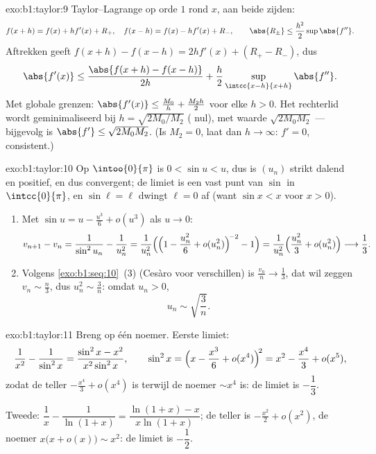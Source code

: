 \begin{solution}{exo:b1:taylor:9}
Taylor--Lagrange op orde $1$ rond $x$, aan beide zijden:
\[
f(x + h) = f(x) + h f'(x) + R_+,\quad
f(x - h) = f(x) - h f'(x) + R_-,
\qquad \abs{R_\pm} \leq \frac{h^2}{2} \sup \abs{f''} .
\]
Aftrekken geeft $f(x+h) - f(x-h) = 2h f'(x) + (R_+ - R_-)$, dus
\[
\abs{f'(x)} \leq \frac{\abs{f(x+h) - f(x-h)}}{2h} +
\frac{h}{2}\sup_{\intcc{x-h}{x+h}}\abs{f''} .
\]
Met globale grenzen: $\abs{f'(x)} \leq \frac{M_0}{h} + \frac{M_2
h}{2}$ voor elke $h > 0$. Het rechterlid wordt geminimaliseerd bij
$h = \sqrt{2M_0/M_2}$ ( nul), met waarde
$\sqrt{2M_0M_2}$ --- bijgevolg is $\abs{f'} \leq \sqrt{2M_0M_2}$.
(Is $M_2 = 0$, laat dan $h \to \infty$: $f' = 0$, consistent.)
\end{solution}

\begin{solution}{exo:b1:taylor:10}
Op $\intoo{0}{\pi}$ is $0 < \sin u < u$, dus is $(u_n)$ strikt
dalend en positief, en dus convergent; de limiet is een vast punt
van $\sin$ in $\intcc{0}{\pi}$, en $\sin \ell = \ell$ dwingt $\ell =
0$ af (want $\sin x < x$ voor $x > 0$).
\begin{enumerate}
  \item Met $\sin u = u - \frac{u^3}{6} + o(u^3)$ als $u \to 0$:
        \[
        v_{n+1} - v_n = \frac{1}{\sin^2 u_n} - \frac{1}{u_n^2}
        = \frac{1}{u_n^2}\Bigl(\Bigl(1 - \frac{u_n^2}{6} +
        o(u_n^2)\Bigr)^{\!-2} - 1\Bigr)
        = \frac{1}{u_n^2}\Bigl(\frac{u_n^2}{3} + o(u_n^2)\Bigr)
        \longrightarrow \frac13 .
        \]
  \item Volgens \cref{exo:b1:seq:10}~(3) (Cesàro voor verschillen)
        is $\frac{v_n}{n} \to \frac13$, dat wil zeggen $v_n \sim
        \frac n3$, dus $u_n^2 \sim \frac 3n$: omdat $u_n > 0$,
        \[
        u_n \sim \sqrt{\frac{3}{n}} .
        \]
\end{enumerate}
\end{solution}

\begin{solution}{exo:b1:taylor:11}
Breng op één noemer. Eerste limiet:
\[
\frac{1}{x^2} - \frac{1}{\sin^2 x}
= \frac{\sin^2 x - x^2}{x^2\sin^2 x},
\qquad
\sin^2 x = \Bigl(x - \frac{x^3}{6} + o(x^4)\Bigr)^{\!2}
= x^2 - \frac{x^4}{3} + o(x^5) ,
\]
zodat de teller $-\frac{x^4}{3} + o(x^4)$ is terwijl de noemer
$\sim x^4$ is: de limiet is $-\dfrac13$.

Tweede: $\dfrac1x - \dfrac{1}{\ln(1+x)} = \dfrac{\ln(1+x) -
x}{x\ln(1+x)}$; de teller is $-\frac{x^2}{2} + o(x^2)$, de noemer
$x\bigl(x + o(x)\bigr) \sim x^2$: de limiet is $-\dfrac12$.
\end{solution}

